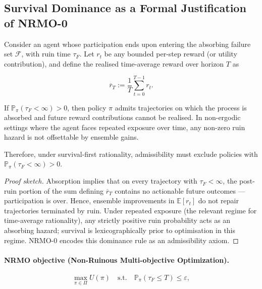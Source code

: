 \subsection{Survival Dominance as a Formal Justification of NRMO-0}
\label{sec:foundations-3-1-1-survival-dominance}

\begin{proposition}
\label{prop:survival-dominance}
Consider an agent whose participation ends upon entering the
absorbing failure set $\mathcal{F}$, with ruin time $\tau_F$. Let
$r_t$ be any bounded per-step reward (or utility contribution), and
define the realised time-average reward over horizon $T$ as

\begin{equation}
\overline{r}_T := \frac{1}{T} \sum_{t=0}^{T-1} r_t.
\end{equation}

If $\mathbb{P}_\pi(\tau_F < \infty) > 0$, then policy $\pi$ admits
trajectories on which the process is absorbed and future reward
contributions cannot be realised. In non-ergodic settings where the
agent faces repeated exposure over time, any non-zero ruin hazard
is not offsettable by ensemble gains.

\noindent
Therefore, under survival-first rationality, admissibility must
exclude policies with $\mathbb{P}_\pi(\tau_F < \infty) > 0$.
\end{proposition}

\begin{proof}[Proof sketch]
Absorption implies that on every trajectory with $\tau_F < \infty$,
the post-ruin portion of the sum defining $\overline{r}_T$ contains
no actionable future outcomes --- participation is over. Hence,
ensemble improvements in $\mathbb{E}[r_t]$ do not repair
trajectories terminated by ruin. Under repeated exposure (the
relevant regime for time-average rationality), any strictly positive
ruin probability acts as an absorbing hazard; survival is
lexicographically prior to optimisation in this regime. NRMO-0
encodes this dominance rule as an admissibility axiom.
\end{proof}

\paragraph{NRMO objective (Non-Ruinous Multi-objective Optimization).}

\begin{equation}
\max_{\pi \in \Pi} U(\pi)
\quad \text{s.t.} \quad
\mathbb{P}_\pi(\tau_F \le T) \le \varepsilon,
\label{eq:foundations-nrmo-objective}
\end{equation}

